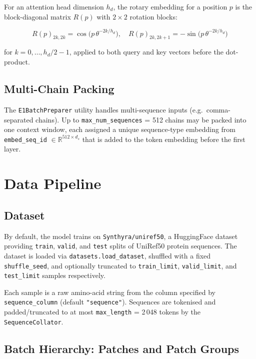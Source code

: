 \documentclass[11pt,a4paper]{article}
\begin{document}
For an attention head dimension $h_d$, the rotary embedding for a position $p$ is the block-diagonal
matrix $R(p)$ with $2\times 2$ rotation blocks:

\begin{equation}
  R(p)_{2k,2k} = \cos\!\bigl(p\,\theta^{-2k/h_d}\bigr), \quad
  R(p)_{2k,2k+1} = -\sin\!\bigl(p\,\theta^{-2k/h_d}\bigr)
\end{equation}

for $k = 0,\ldots,h_d/2 - 1$, applied to both query and key vectors before the dot-product.

\subsection{Multi-Chain Packing}

The \texttt{E1BatchPreparer} utility handles multi-sequence inputs (e.g.\ comma-separated chains).
Up to \texttt{max\_num\_sequences} = 512 chains may be packed into one context window, each
assigned a unique sequence-type embedding from \texttt{embed\_seq\_id}
$\in \mathbb{R}^{512 \times d_s}$ that is added to the token embedding before the first layer.

\section{Data Pipeline}

\subsection{Dataset}

By default, the model trains on \texttt{Synthyra/uniref50}, a HuggingFace dataset providing
\texttt{train}, \texttt{valid}, and \texttt{test} splits of UniRef50 protein sequences.
The dataset is loaded via \texttt{datasets.load\_dataset}, shuffled with a fixed
\texttt{shuffle\_seed}, and optionally truncated to \texttt{train\_limit},
\texttt{valid\_limit}, and \texttt{test\_limit} samples respectively.

Each sample is a raw amino-acid string from the column specified by \texttt{sequence\_column}
(default \texttt{"sequence"}).  Sequences are tokenised and padded/truncated to at most
\texttt{max\_length} = 2\,048 tokens by the \texttt{SequenceCollator}.

\subsection{Batch Hierarchy: Patches and Patch Groups}
\end{document}
